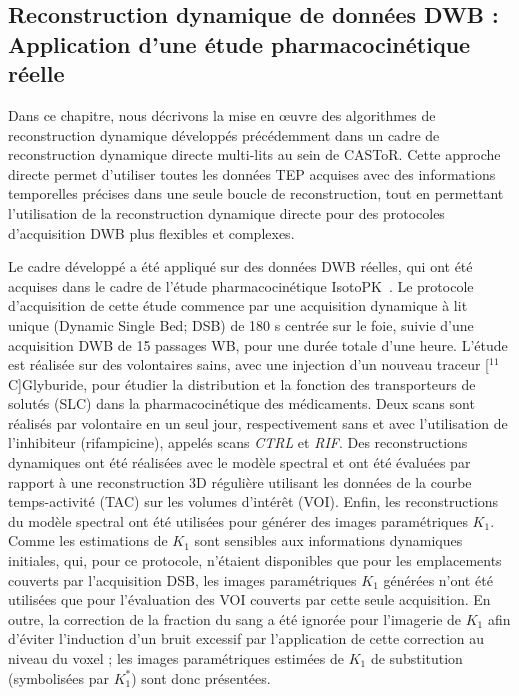 \documentclass[a4paper]{article}
\begin{document}
\subsection*{Reconstruction dynamique de données DWB : Application d'une étude pharmacocinétique réelle}
Dans ce chapitre, nous décrivons la mise en œuvre des algorithmes de reconstruction dynamique développés précédemment dans un cadre de reconstruction dynamique directe multi-lits au sein de CASToR. Cette approche directe permet d'utiliser toutes les données TEP acquises avec des informations temporelles précises dans une seule boucle de reconstruction, tout en permettant l'utilisation de la reconstruction dynamique directe pour des protocoles d'acquisition DWB plus flexibles et complexes.

Le cadre développé a été appliqué sur des données DWB réelles, qui ont été acquises dans le cadre de l'étude pharmacocinétique IsotoPK~\cite{Marie2019}. 
Le protocole d'acquisition de cette étude commence par une acquisition dynamique à lit unique (Dynamic Single Bed; DSB) de 180 s centrée sur le foie, suivie d'une acquisition DWB de 15 passages WB, pour une durée totale d'une heure. L'étude est réalisée sur des volontaires sains, avec une injection d'un nouveau traceur [$^{11}$C]Glyburide, pour étudier la distribution et la fonction des transporteurs de solutés (SLC) dans la pharmacocinétique des médicaments. Deux scans sont réalisés par volontaire en un seul jour, respectivement sans et avec l'utilisation de l'inhibiteur (rifampicine), appelés scans \textit{CTRL} et \textit{RIF}.
Des reconstructions dynamiques ont été réalisées avec le modèle spectral et ont été évaluées par rapport à une reconstruction 3D régulière utilisant les données de la courbe temps-activité (TAC) sur les volumes d'intérêt (VOI). Enfin, les reconstructions du modèle spectral ont été utilisées pour générer des images paramétriques $K_1$. Comme les estimations de $K_1$ sont sensibles aux informations dynamiques initiales, qui, pour ce protocole, n'étaient disponibles que pour les emplacements couverts par l'acquisition DSB, les images paramétriques $K_1$ générées n'ont été utilisées que pour l'évaluation des VOI couverts par cette seule acquisition. En outre, la correction de la fraction du sang a été ignorée pour l'imagerie de $K_1$ afin d'éviter l'induction d'un bruit excessif par l'application de cette correction au niveau du voxel ; les images paramétriques estimées de $K_1$ de substitution (symbolisées par $K_1^{*}$) sont donc présentées.
\end{document}
